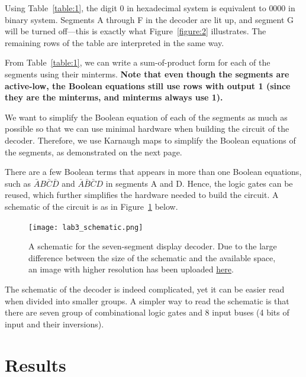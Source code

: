 \documentclass[12pt]{article}
\begin{document}
Using Table~\ref{table:1}, the digit $0$ in hexadecimal system is equivalent to $0000$ in binary system. Segments A through F in the decoder are lit up, and segment G will be turned off---this is exactly what Figure~\ref{figure:2} illustrates. The remaining rows of the table are interpreted in the same way.

From Table~\ref{table:1}, we can write a sum-of-product form for each of the segments using their minterms. \textbf{Note that even though the segments are active-low, the Boolean equations still use rows with output 1 (since they are the minterms, and minterms always use 1).}

We want to simplify the Boolean equation of each of the segments as much as possible so that we can use minimal hardware when building the circuit of the decoder. Therefore, we use Karnaugh maps to simplify the Boolean equations of the segments, as demonstrated on the next page.



There are a few Boolean terms that appears in more than one Boolean equations, such as $\bar{A}B\bar{C}\bar{D}$ and $\bar{A}\bar{B}\bar{C}D$ in segments A and D. Hence, the logic gates can be reused, which further simplifies the hardware needed to build the circuit. A schematic of the circuit is as in Figure~\ref{figure:4} below.

\begin{figure}[h]
  \centering
  \texttt{[image: lab3\_schematic.png]}
  \caption{A schematic for the seven-segment display decoder. Due to the large difference between the size of the schematic and the available space, an image with higher resolution has been uploaded \href{https://i.imgur.com/jaLoZg9.jpg}{here}.}
  \label{figure:4}
\end{figure}

The schematic of the decoder is indeed complicated, yet it can be easier read when divided into smaller groups. A simpler way to read the schematic is that there are seven group of combinational logic gates and 8 input buses (4 bits of input and their inversions).

\section{Results}
\end{document}
